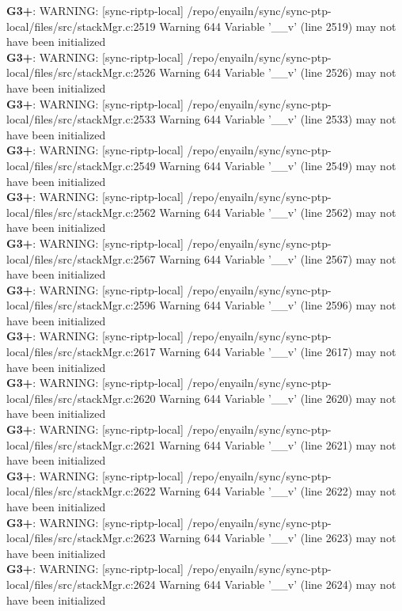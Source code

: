 \documentclass[12pt,twoside]{article}
\begin{document}
\textbf{G3+}: WARNING: [sync-riptp-local] /repo/enyailn/sync/sync-ptp-local/files/src/stackMgr.c:2519 Warning 644 Variable '\_\_v' (line 2519) may not have been initialized\\ 
\textbf{G3+}: WARNING: [sync-riptp-local] /repo/enyailn/sync/sync-ptp-local/files/src/stackMgr.c:2526 Warning 644 Variable '\_\_v' (line 2526) may not have been initialized\\ 
\textbf{G3+}: WARNING: [sync-riptp-local] /repo/enyailn/sync/sync-ptp-local/files/src/stackMgr.c:2533 Warning 644 Variable '\_\_v' (line 2533) may not have been initialized\\ 
\textbf{G3+}: WARNING: [sync-riptp-local] /repo/enyailn/sync/sync-ptp-local/files/src/stackMgr.c:2549 Warning 644 Variable '\_\_v' (line 2549) may not have been initialized\\ 
\textbf{G3+}: WARNING: [sync-riptp-local] /repo/enyailn/sync/sync-ptp-local/files/src/stackMgr.c:2562 Warning 644 Variable '\_\_v' (line 2562) may not have been initialized\\ 
\textbf{G3+}: WARNING: [sync-riptp-local] /repo/enyailn/sync/sync-ptp-local/files/src/stackMgr.c:2567 Warning 644 Variable '\_\_v' (line 2567) may not have been initialized\\ 
\textbf{G3+}: WARNING: [sync-riptp-local] /repo/enyailn/sync/sync-ptp-local/files/src/stackMgr.c:2596 Warning 644 Variable '\_\_v' (line 2596) may not have been initialized\\ 
\textbf{G3+}: WARNING: [sync-riptp-local] /repo/enyailn/sync/sync-ptp-local/files/src/stackMgr.c:2617 Warning 644 Variable '\_\_v' (line 2617) may not have been initialized\\ 
\textbf{G3+}: WARNING: [sync-riptp-local] /repo/enyailn/sync/sync-ptp-local/files/src/stackMgr.c:2620 Warning 644 Variable '\_\_v' (line 2620) may not have been initialized\\ 
\textbf{G3+}: WARNING: [sync-riptp-local] /repo/enyailn/sync/sync-ptp-local/files/src/stackMgr.c:2621 Warning 644 Variable '\_\_v' (line 2621) may not have been initialized\\ 
\textbf{G3+}: WARNING: [sync-riptp-local] /repo/enyailn/sync/sync-ptp-local/files/src/stackMgr.c:2622 Warning 644 Variable '\_\_v' (line 2622) may not have been initialized\\ 
\textbf{G3+}: WARNING: [sync-riptp-local] /repo/enyailn/sync/sync-ptp-local/files/src/stackMgr.c:2623 Warning 644 Variable '\_\_v' (line 2623) may not have been initialized\\ 
\textbf{G3+}: WARNING: [sync-riptp-local] /repo/enyailn/sync/sync-ptp-local/files/src/stackMgr.c:2624 Warning 644 Variable '\_\_v' (line 2624) may not have been initialized\\ 
\end{document}
